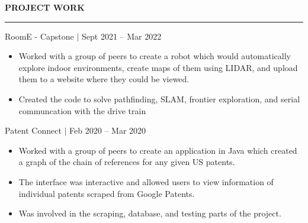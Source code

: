 \documentclass[12pt]{article}
\newcommand{\sectionRule}{\textcolor{gray}{\rule{7.27in}{0.02cm}}}
\newcommand{\sectionTxt}[1]{\noindent\textbf{#1}\\}
\newcommand{\projText}[2]{\noindent#1 $|$ {\color{textGray} #2}}
\begin{document}
    \sectionTxt{PROJECT WORK}
    \sectionRule

    \projText{RoomE - Capstone}{Sept 2021 -- Mar 2022}
    \begin{small}
        \begin{itemize}
            \itemsep0em 
            \item {\color{textGray} Worked with a group of peers to create a robot which would automatically explore indoor environments, create maps of them using LIDAR, and upload them to a website where they could be viewed.}
            \item {\color{textGray} Created the code to solve pathfinding, SLAM, frontier exploration, and serial communcation with the drive train }
        \end{itemize}
    \end{small}

    \projText{Patent Connect}{Feb 2020 -- Mar 2020}
    \begin{small}
        \begin{itemize}
            \itemsep0em 
            \item {\color{textGray} Worked with a group of peers to create an application in Java which created a graph of the chain of references for any given US patents.}
            \item {\color{textGray} The interface was interactive and allowed users to view information of individual patents scraped from Google Patents.}
            \item {\color{textGray} Was involved in the scraping, database, and testing parts of the project.}
        \end{itemize}
    \end{small}
\end{document}
